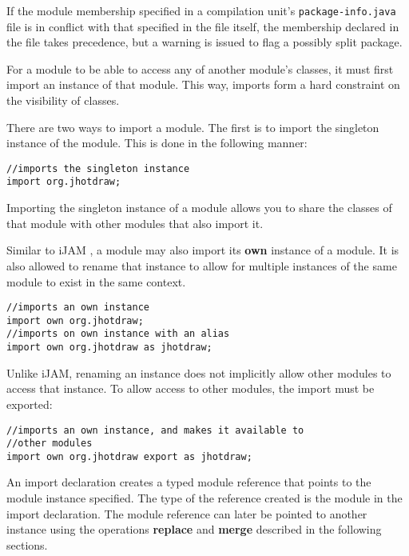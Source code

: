 If the module membership specified in a compilation unit's {\tt package-info.java}
file is in conflict with that specified in the file itself, the membership
declared in the file takes precedence, but a warning is issued to flag a possibly
split package.


For a module to be able to access any of another module's classes,
it must first import an instance of that module. This way, imports form
a hard constraint on the visibility of classes.

There are two ways to import a module. The first is to import the singleton
instance of the module. This is done in the following manner:

\begin{lstlisting}
//imports the singleton instance
import org.jhotdraw;
\end{lstlisting}

Importing the singleton instance of a module allows you to share the classes
of that module with other modules that also import it.

Similar to iJAM \cite{iJAM}, a module may also import its \textbf{own} instance of
a module. It is also allowed to rename that instance to allow for multiple
instances of the same module to exist in the same context.

\begin{lstlisting}
//imports an own instance
import own org.jhotdraw;
//imports on own instance with an alias
import own org.jhotdraw as jhotdraw;
\end{lstlisting}

Unlike iJAM, renaming an instance does not implicitly allow other
modules to access that instance. To allow access to other modules, the import
must be exported:

\begin{lstlisting}
//imports an own instance, and makes it available to
//other modules
import own org.jhotdraw export as jhotdraw;
\end{lstlisting}

An import declaration creates a typed module reference that points to the module
instance specified. The type of the reference created is the module
in the import declaration. The module reference can later be pointed to another
instance using the operations \textbf{replace} and \textbf{merge} described
in the following sections.

